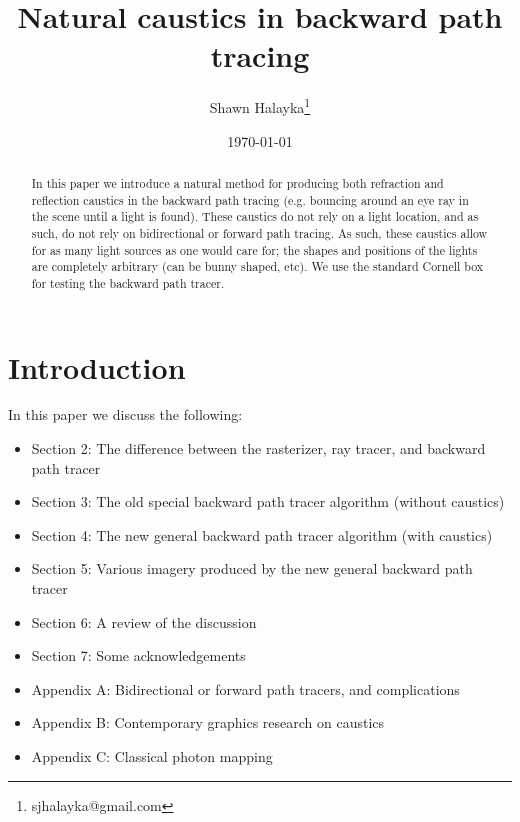 \documentclass[12pt]{article}
\title{Natural caustics in backward path tracing}
\author{
Shawn Halayka\footnote{sjhalayka@gmail.com}
}
\date{\today\;\currenttime}
\begin{document}
\newcommand{\abs}[1]{\lvert#1\rvert}



\maketitle




\begin{abstract}
In this paper we introduce a natural method for producing both refraction and reflection caustics in the backward path tracing (e.g. bouncing around an eye ray in the scene until a light is found).
These caustics do not rely on a light location, and as such, do not rely on bidirectional or forward path tracing.
As such, these caustics allow for as many light sources as one would care for; the shapes and positions of the lights are completely arbitrary (can be bunny shaped, etc).
We use the standard Cornell box for testing the backward path tracer.
\end{abstract}



\section{Introduction}

In this paper we discuss the following:
\begin{itemize}
\item Section 2: The difference between the rasterizer, ray tracer, and backward path tracer
\item Section 3: The old special backward path tracer algorithm (without caustics)
\item Section 4: The new general backward path tracer algorithm (with caustics)
\item Section 5: Various imagery produced by the new general backward path tracer
\item Section 6: A review of the discussion
\item Section 7: Some acknowledgements
\item Appendix A: Bidirectional or forward path tracers, and complications
\item Appendix B: Contemporary graphics research on caustics
\item Appendix C: Classical photon mapping
\end{itemize}
\end{document}
